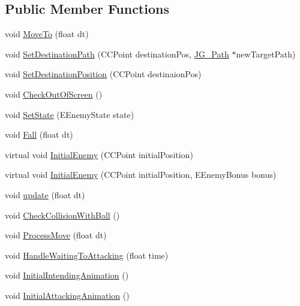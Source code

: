 \subsection*{Public Member Functions}
\begin{DoxyCompactItemize}
\item 
void \hyperlink{class_j_g___enemy___base_a0c32f5ce5ebd4d988ca7f2eb485634c5}{Move\-To} (float dt)
\item 
void \hyperlink{class_j_g___enemy___base_a9ec36f3012a3bc79f5f4da1efd0f5a17}{Set\-Destination\-Path} (C\-C\-Point destination\-Pos, \hyperlink{class_j_g___path}{J\-G\-\_\-\-Path} $\ast$new\-Target\-Path)
\item 
void \hyperlink{class_j_g___enemy___base_a44b421c3ab84dce24b4c59f3c5d94c5c}{Set\-Destination\-Position} (C\-C\-Point destinaion\-Pos)
\item 
void \hyperlink{class_j_g___enemy___base_a981f54e4d7f7fb1e10e57ce5ae0e7e6c}{Check\-Out\-Of\-Screen} ()
\item 
void \hyperlink{class_j_g___enemy___base_af7d600c7327aa775fc3149b76b8d7050}{Set\-State} (E\-Enemy\-State state)
\item 
void \hyperlink{class_j_g___enemy___base_ae7d83ddaed626a47dda3d14c26c94f44}{Fall} (float dt)
\item 
virtual void \hyperlink{class_j_g___enemy___base_a8dacf683f1b41612faf87df7f144cf81}{Initial\-Enemy} (C\-C\-Point initial\-Position)
\item 
virtual void \hyperlink{class_j_g___enemy___base_acdfcfb221314eb5c3067aacb8aa4d34f}{Initial\-Enemy} (C\-C\-Point initial\-Position, E\-Enemy\-Bonus bonus)
\item 
void \hyperlink{class_j_g___enemy___base_a026d475d28ed59d88c00d55622ffb501}{update} (float dt)
\item 
void \hyperlink{class_j_g___enemy___base_a7b292e23ac507fe700721cbfb363c5ab}{Check\-Collision\-With\-Ball} ()
\item 
void \hyperlink{class_j_g___enemy___base_aa3a97d79f8845764a9934696b4ab5303}{Process\-Move} (float dt)
\item 
void \hyperlink{class_j_g___enemy___base_a78e893ce15f84acd45b310d1d7f2d62c}{Handle\-Waiting\-To\-Attacking} (float time)
\item 
void \hyperlink{class_j_g___enemy___base_ab502e8bfc62c219a5a53fa64f73ceace}{Initial\-Intending\-Animation} ()
\item 
void \hyperlink{class_j_g___enemy___base_a04f490f8d7d07bddba76ab7dd7dcc2a4}{Initial\-Attacking\-Animation} ()
\item 

\end{DoxyCompactItemize}

